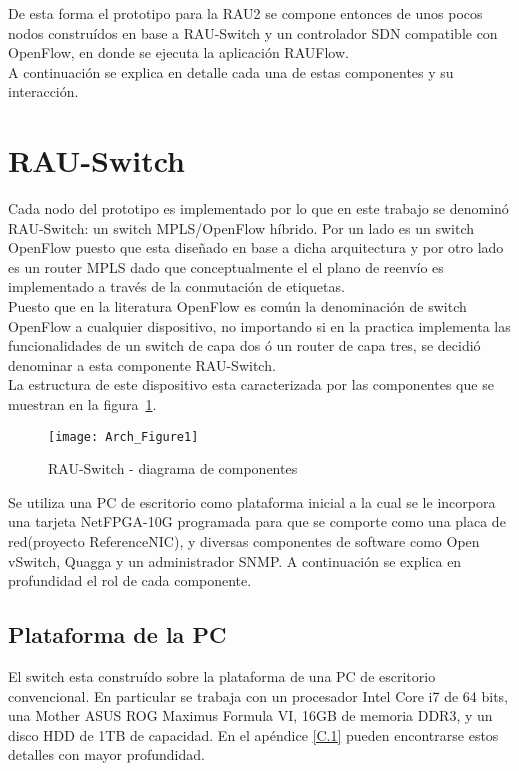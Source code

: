 De esta forma el prototipo para la RAU2 se compone entonces de unos pocos nodos constru\'idos en base a RAU-Switch y un controlador SDN compatible con OpenFlow, en donde se ejecuta la aplicaci\'on RAUFlow.\\

A continuaci\'on se explica en detalle cada una de estas componentes y su interacci\'on.

\section{RAU-Switch}
Cada nodo del prototipo es implementado por lo que en este trabajo se denomin\'o RAU-Switch: un switch MPLS/OpenFlow híbrido. Por un lado es un switch OpenFlow puesto que esta dise\~nado en base a dicha arquitectura y por otro lado es un router MPLS dado que conceptualmente el el plano de reenvío es implementado a trav\'es de la conmutación de etiquetas.\\

Puesto que en la literatura OpenFlow es común la denominación de switch OpenFlow a cualquier dispositivo, no importando si en la practica implementa las funcionalidades de un switch de capa dos \'o un router de capa tres, se decidió denominar a esta componente RAU-Switch.\\

La estructura de este dispositivo esta caracterizada por las componentes que se muestran en la figura~\ref{fig:OpenSourceRArch}.

\begin{figure}[htbp!] 
\centering    
\texttt{[image: Arch\_Figure1]}
\caption[RAU-Switch - diagrama de componentes]{RAU-Switch - diagrama de componentes}
\label{fig:OpenSourceRArch}
\end{figure}

Se utiliza una PC de escritorio como plataforma inicial a la cual se le incorpora una tarjeta NetFPGA-10G programada para que se comporte como una placa de red(proyecto ReferenceNIC), y diversas componentes de software como Open vSwitch, Quagga y un administrador SNMP. A continuaci\'on se explica en profundidad el rol de cada componente.

\subsection{Plataforma de la PC}
El switch esta constru\'ido sobre la plataforma de una PC de escritorio convencional. En particular se trabaja con un procesador Intel Core i7 de 64 bits, una Mother ASUS ROG Maximus Formula VI, 16GB de memoria DDR3, y un disco HDD de 1TB de capacidad. En el apéndice \ref{C.1} pueden encontrarse estos detalles con mayor profundidad.

